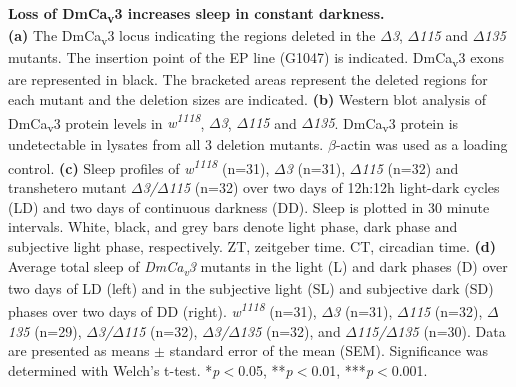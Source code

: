 \label{fig:S3}
\textbf{Loss of DmCa\textsubscript{v}3 increases sleep in constant darkness.}
\\
\textbf{(a)} The DmCa\textsubscript{v}3 locus indicating the regions deleted in the \emph{$\Delta$3}, \emph{$\Delta$115} and \emph{$\Delta$135} mutants.
The insertion point of the EP line (G1047) is indicated.
DmCa\textsubscript{v}3 exons are represented in black.
The bracketed areas represent the deleted regions for each mutant and the deletion sizes are indicated.
\textbf{(b)} Western blot analysis of DmCa\textsubscript{v}3 protein levels in \emph{w\textsuperscript{1118}}, \emph{$\Delta$3}, \emph{$\Delta$115} and \emph{$\Delta$135}.
DmCa\textsubscript{v}3 protein is undetectable in lysates from all 3 deletion mutants.
$\beta$-actin was used as a loading control.
\textbf{(c)} Sleep profiles of \emph{w\textsuperscript{1118}} (n=31), \emph{$\Delta$3} (n=31), \emph{$\Delta$115} (n=32) and transhetero mutant \emph{$\Delta$3/$\Delta$115} (n=32) over two days of 12h:12h light-dark cycles (LD) and two days of continuous darkness (DD).
Sleep is plotted in 30 minute intervals.
White, black, and grey bars denote light phase, dark phase and subjective light phase, respectively.
ZT, zeitgeber time.
CT, circadian time.
\textbf{(d)} Average total sleep of \emph{DmCa\textsubscript{v}3} mutants in the light (L) and dark phases (D) over two days of LD (left) and in the subjective light (SL) and subjective dark (SD) phases over two days of DD (right).
\emph{w\textsuperscript{1118}} (n=31), \emph{$\Delta$3} (n=31), \emph{$\Delta$115} (n=32), \emph{$\Delta$135} (n=29), \emph{$\Delta$3/$\Delta$115} (n=32), \emph{$\Delta$3/$\Delta$135} (n=32), and \emph{$\Delta$115/$\Delta$135} (n=30).
Data are presented as means $\pm$ standard error of the mean (SEM).
Significance was determined with Welch's t-test.
*\emph{p}$<$0.05, **\emph{p}$<$0.01, ***\emph{p}$<$0.001.
